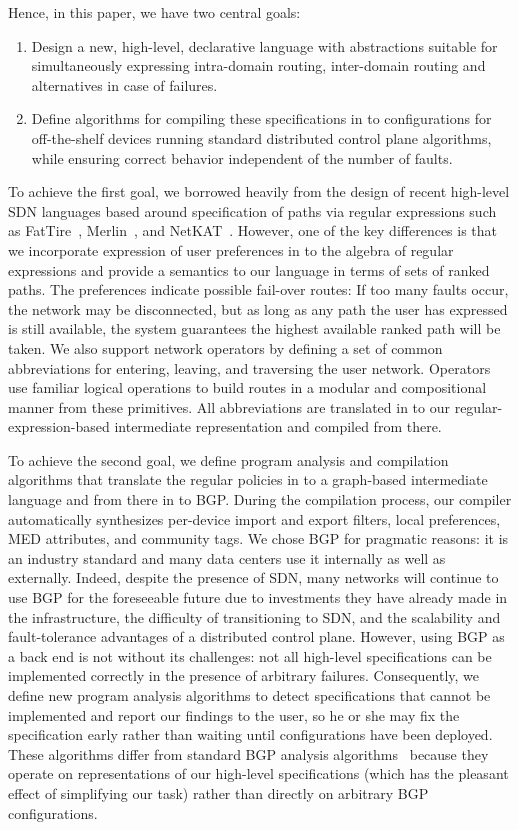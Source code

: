 Hence, in this paper, we have two central goals:
\begin{enumerate}
\item Design a new, high-level, declarative language with abstractions 
suitable for simultaneously expressing intra-domain routing, inter-domain 
routing and alternatives in case of failures.
\item Define algorithms for compiling these specifications in to 
configurations for off-the-shelf devices running standard
distributed control plane algorithms, while ensuring correct behavior
independent of the number of faults.
\end{enumerate}

To achieve the first goal, we borrowed heavily from the design of
recent high-level SDN languages based around specification of 
paths via regular expressions such as FatTire~\cite{fattire}, 
Merlin~\cite{foster:merlin}, and
NetKAT~\cite{netkat}.  However, one of the key differences is that
we incorporate expression of user preferences in to the algebra
of regular expressions and provide a semantics to our language
in terms of sets of ranked paths.  The preferences indicate possible
fail-over routes:  If too many faults occur, the network may be
disconnected, but as long as any path the user has expressed is
still available, the system guarantees the highest available ranked
path will be taken.  We also support network operators by defining a
set of common abbreviations for entering, leaving, and traversing
the user network.  Operators use familiar logical operations
to build routes in a modular and compositional manner from these 
primitives.  All abbreviations are translated in to our regular-expression-based
intermediate representation and compiled from there.

To achieve the second goal, we define program analysis and compilation
algorithms that translate the regular policies in to a graph-based
intermediate language and from there in to BGP.  During the
compilation process, our compiler automatically synthesizes per-device
import and export filters, local preferences, MED attributes, and 
community tags.  We chose BGP for pragmatic reasons:  it is an industry
standard and many data centers use it internally as well as externally.
Indeed, despite the presence of SDN, many networks will continue to
use BGP for the foreseeable future due to investments they have already
made in the infrastructure, the difficulty of transitioning to SDN,
and the scalability and fault-tolerance advantages of a distributed
control plane.  However, using BGP as a back end is not without its 
challenges: not all high-level specifications can be implemented correctly in
the presence of arbitrary failures.  Consequently, we define new
program analysis algorithms to detect specifications that cannot be implemented
and report our findings to the user, so he or she may fix the specification
early rather than waiting until configurations have been deployed.  
These algorithms differ from
standard BGP analysis algorithms~\cite{feamster:rcc,batfish} because they operate on representations of
our high-level specifications (which has the pleasant effect of simplifying our 
task) rather than directly on arbitrary BGP configurations.

